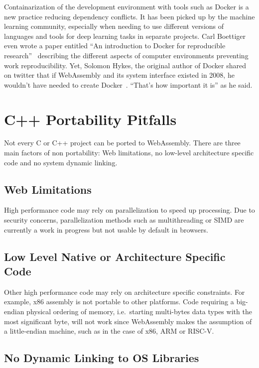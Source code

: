Containarization of the development environment with tools such as Docker
is a new practice reducing dependency conflicts.
It has been picked up by the machine learning community,
especially when needing to use different versions of languages and tools
for deep learning tasks in separate projects.
Carl Boettiger even wrote a paper entitled
``An introduction to Docker for reproducible research''~\cite{boettiger2015introduction}
describing the different aspects of computer environments preventing work reproducibility.
Yet, Solomon Hykes, the original author of Docker shared on twitter that
if WebAssembly and its system interface existed in 2008, he wouldn't have
needed to create Docker~\cite{hykes2019twitter}. ``That's how important it is'' as he said.

\section{C++ Portability Pitfalls}%
\label{sec:cpp_pitfalls}

Not every C or C++ project can be ported to WebAssembly.
There are three main factors of non portability:
Web limitations, no low-level architecture specific code and no system dynamic linking.

\subsection{Web Limitations}%
\label{sub:web_limitations}

High performance code may rely on parallelization to speed up processing.
Due to security concerns, parallelization methods such as multithreading
or SIMD are currently a work in progress but not usable by default in browsers.

\subsection{Low Level Native or Architecture Specific Code}%
\label{sub:low_level_code}

Other high performance code may rely on architecture specific constraints.
For example, x86 assembly is not portable to other platforms.
Code requiring a big-endian physical ordering of memory,
i.e.\ starting multi-bytes data types with the most significant byte,
will not work since WebAssembly makes the assumption of a little-endian machine,
such as in the case of x86, ARM or RISC-V.

\subsection{No Dynamic Linking to OS Libraries}%
\label{sub:no_dynamic_linking}

